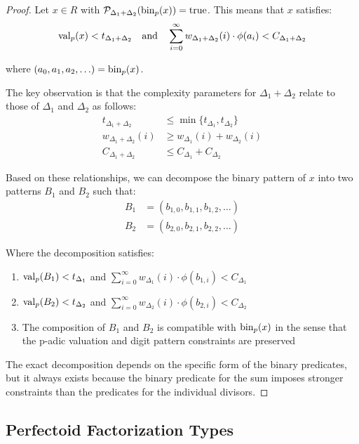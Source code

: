 \begin{proof}
Let $x \in R$ with $\mathcal{P}_{\Delta_1+\Delta_2}(\operatorname{bin}_p(x)) = \text{true}$. This means that $x$ satisfies:
$$\operatorname{val}_p(x) < t_{\Delta_1+\Delta_2} \quad \text{and} \quad \sum_{i=0}^{\infty} w_{\Delta_1+\Delta_2}(i) \cdot \phi(a_i) < C_{\Delta_1+\Delta_2}$$

where $(a_0, a_1, a_2, \ldots) = \operatorname{bin}_p(x)$.

The key observation is that the complexity parameters for $\Delta_1 + \Delta_2$ relate to those of $\Delta_1$ and $\Delta_2$ as follows:
\begin{align*}
t_{\Delta_1+\Delta_2} &\leq \min\{t_{\Delta_1}, t_{\Delta_2}\} \\
w_{\Delta_1+\Delta_2}(i) &\geq w_{\Delta_1}(i) + w_{\Delta_2}(i) \\
C_{\Delta_1+\Delta_2} &\leq C_{\Delta_1} + C_{\Delta_2}
\end{align*}

Based on these relationships, we can decompose the binary pattern of $x$ into two patterns $B_1$ and $B_2$ such that:
\begin{align*}
B_1 &= (b_{1,0}, b_{1,1}, b_{1,2}, \ldots) \\
B_2 &= (b_{2,0}, b_{2,1}, b_{2,2}, \ldots)
\end{align*}

Where the decomposition satisfies:
\begin{enumerate}
    \item $\operatorname{val}_p(B_1) < t_{\Delta_1}$ and $\sum_{i=0}^{\infty} w_{\Delta_1}(i) \cdot \phi(b_{1,i}) < C_{\Delta_1}$
    \item $\operatorname{val}_p(B_2) < t_{\Delta_2}$ and $\sum_{i=0}^{\infty} w_{\Delta_2}(i) \cdot \phi(b_{2,i}) < C_{\Delta_2}$
    \item The composition of $B_1$ and $B_2$ is compatible with $\operatorname{bin}_p(x)$ in the sense that the p-adic valuation and digit pattern constraints are preserved
\end{enumerate}

The exact decomposition depends on the specific form of the binary predicates, but it always exists because the binary predicate for the sum imposes stronger constraints than the predicates for the individual divisors.
\end{proof}

\subsection{Perfectoid Factorization Types}


